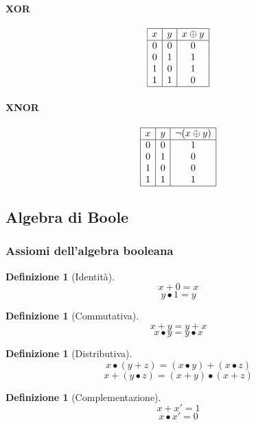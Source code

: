 \documentclass[a4paper,12pt]{article}
\theoremstyle{mystyle}
\newtheorem{definition}[theorem]{Definizione}
\begin{document}
\paragraph{XOR}
\[
\begin{array}{|c|c|c|}
\hline
x & y & x \oplus y \\
\hline
0 & 0 & 0 \\
0 & 1 & 1 \\
1 & 0 & 1 \\
1 & 1 & 0 \\
\hline
\end{array}
\]

\paragraph{XNOR}
\[
\begin{array}{|c|c|c|}
\hline
x & y & \lnot(x \oplus y) \\
\hline
0 & 0 & 1 \\
0 & 1 & 0 \\
1 & 0 & 0 \\
1 & 1 & 1 \\
\hline
\end{array}
\]

\subsection{Algebra di Boole}
\subsubsection{Assiomi dell'algebra booleana}


\begin{definition}[Identità]
    \[
        x+0=x
    \]
    \[
        y \bullet 1 = y
    \]
\end{definition}

\begin{definition}[Commutativa]
    \[
        x+y=y+x
    \]
    \[
        x \bullet y = y \bullet x
    \]
\end{definition}

\begin{definition}[Distributiva]
    \[
        x \bullet (y+z) = (x \bullet y)+(x \bullet z)
    \]
    \[
        x+(y \bullet z) = (x+y) \bullet (x+z)
    \]
\end{definition}

\begin{definition}[Complementazione]
    \[
        x+x'=1
    \]
    \[
        x \bullet x' = 0
    \]
\end{definition}
\end{document}
